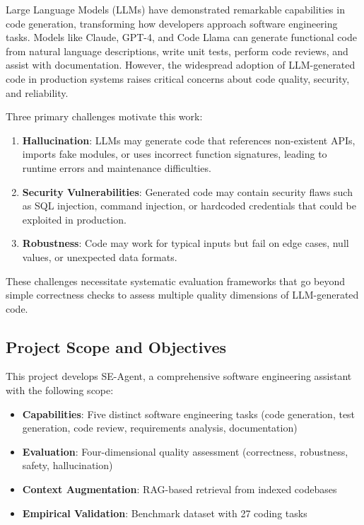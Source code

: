 \documentclass[12pt,a4paper]{article}
\begin{document}
Large Language Models (LLMs) have demonstrated remarkable capabilities in code generation, transforming how developers approach software engineering tasks. Models like Claude, GPT-4, and Code Llama can generate functional code from natural language descriptions, write unit tests, perform code reviews, and assist with documentation. However, the widespread adoption of LLM-generated code in production systems raises critical concerns about code quality, security, and reliability.

Three primary challenges motivate this work:

\begin{enumerate}
    \item \textbf{Hallucination}: LLMs may generate code that references non-existent APIs, imports fake modules, or uses incorrect function signatures, leading to runtime errors and maintenance difficulties.
    \item \textbf{Security Vulnerabilities}: Generated code may contain security flaws such as SQL injection, command injection, or hardcoded credentials that could be exploited in production.
    \item \textbf{Robustness}: Code may work for typical inputs but fail on edge cases, null values, or unexpected data formats.
\end{enumerate}

These challenges necessitate systematic evaluation frameworks that go beyond simple correctness checks to assess multiple quality dimensions of LLM-generated code.

\subsection{Project Scope and Objectives}

This project develops SE-Agent, a comprehensive software engineering assistant with the following scope:

\begin{itemize}
    \item \textbf{Capabilities}: Five distinct software engineering tasks (code generation, test generation, code review, requirements analysis, documentation)
    \item \textbf{Evaluation}: Four-dimensional quality assessment (correctness, robustness, safety, hallucination)
    \item \textbf{Context Augmentation}: RAG-based retrieval from indexed codebases
    \item \textbf{Empirical Validation}: Benchmark dataset with 27 coding tasks
\end{itemize}
\end{document}
